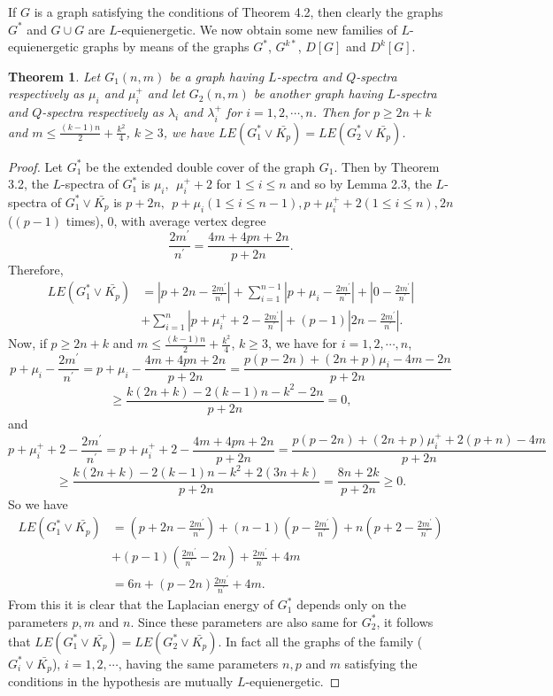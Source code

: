 \documentclass[12pt,a4paper]{amsart}
\newtheorem{theorem}{Theorem}[section]
\theoremstyle{theorem}
\theoremstyle{definition}
\numberwithin{equation}{section} \makeatletter
\begin{document}
 \indent If $G$ is a graph satisfying the conditions of Theorem 4.2, then clearly the graphs $G^*$ and $G\cup G$ are $L$-equienergetic. We now obtain some new families of $L$-equienergetic graphs by means of the graphs $G^*$, $G^{k*}$, $D[G]$ and $D^k[G]$.
 \begin{theorem}
 Let $G_1(n,m)$ be a graph having $L$-spectra and $Q$-spectra respectively as $\mu_i$ and $\mu_i^+$ and let $G_2(n,m)$ be another graph having  $L$-spectra and $Q$-spectra respectively as $\lambda_i$ and $\lambda_i^+$ for $i=1,2,\cdots,n$. Then for $p\geq 2n+k$ and $m\leq \frac{(k-1)n}{2}+\frac{k^2}{4}$, $k\geq 3$, we have $LE(G_1^*\vee \bar{K_p})= LE(G_2^*\vee \bar{K_p})$.
 \end{theorem}
 \begin{proof}
 Let $G_1^*$ be the extended double cover of the graph $G_1$. Then by Theorem 3.2, the $L$-spectra of $G_1^*$ is $\mu_i,~~ \mu_i^{+}+2$ for $1\leq i\leq n$ and so by Lemma 2.3, the $L$-spectra of $G_1^*\vee \bar{K_p}$ is $p+2n,~~ p+\mu_i (1\leq i\leq n-1), p+\mu_i^{+}+2 (1\leq i\leq n), 2n$ ($(p-1)$ times), $0$, with average vertex degree $$\frac{2m^{\prime}}{n^{\prime}}=\frac{4m+4pn+2n}{p+2n}.$$ Therefore,
 \begin{align*}
 LE(G_1^*\vee \bar{K_p})&=|p+2n-\frac{2m^{\prime}}{n^{\prime}}|+\sum\limits_{i=1}^{n-1}|p+\mu_i-\frac{2m^{\prime}}{n^{\prime}}|+|0-\frac{2m^{\prime}}{n^{\prime}}|\\&+\sum\limits_{i=1}^{n}|p+\mu_i^{+}+2-\frac{2m^{\prime}}{n^{\prime}}|+(p-1)|2n-\frac{2m^{\prime}}{n^{\prime}}|.
 \end{align*}
 Now, if $p\geq 2n+k$ and $m\leq \frac{(k-1)n}{2}+\frac{k^2}{4}$, $k\geq 3$, we have for $i=1,2,\cdots,n$,
 $$p+\mu_i-\frac{2m^{\prime}}{n^{\prime}}=p+\mu_i-\frac{4m+4pn+2n}{p+2n}=\frac{p(p-2n)+(2n+p)\mu_i-4m-2n}{p+2n}$$ $$\geq \frac{k(2n+k)-2(k-1)n-k^2-2n}{p+2n}=0,$$
 and $$p+\mu_i^{+}+2-\frac{2m^{\prime}}{n^{\prime}}=p+\mu_i^{+}+2-\frac{4m+4pn+2n}{p+2n}=\frac{p(p-2n)+(2n+p)\mu_i^{+}+2(p+n)-4m}{p+2n}$$ $$\geq \frac{k(2n+k)-2(k-1)n-k^2+2(3n+k)}{p+2n}=\frac{8n+2k}{p+2n}\geq 0.$$
 So we have
 \begin{align*}
 LE(G_1^*\vee \bar{K_p})&=(p+2n-\frac{2m^{\prime}}{n^{\prime}})+(n-1)(p-\frac{2m^{\prime}}{n^{\prime}})+n(p+2-\frac{2m^{\prime}}{n^{\prime}})\\&+(p-1)(\frac{2m^{\prime}}{n^{\prime}}-2n)+\frac{2m^{\prime}}{n^{\prime}}+4m\\&
 =6n+(p-2n)\frac{2m^{\prime}}{n^{\prime}}+4m.
 \end{align*}
\indent From this it is clear that the Laplacian energy of $G_1^*$ depends only on the parameters $p, m$ and $n$. Since these parameters are also same for $G_2^*$, it follows that $LE(G_1^*\vee \bar{K_p})= LE(G_2^*\vee \bar{K_p})$.  In fact all the graphs of the family ($G_i^*\vee \bar{K_p}$), $i=1,2,\cdots$, having the same parameters $n, p$ and $m$ satisfying the conditions in the hypothesis are mutually $L$-equienergetic.
 \end{proof}
\end{document}

